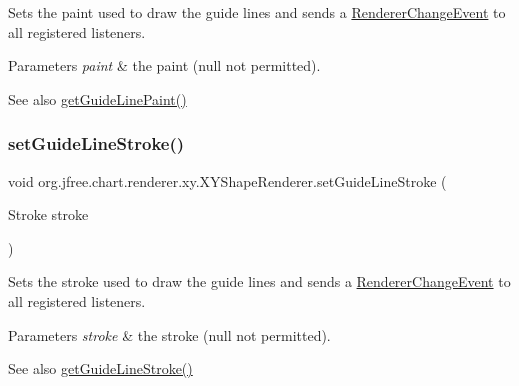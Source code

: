 Sets the paint used to draw the guide lines and sends a \mbox{\hyperlink{}{Renderer\+Change\+Event}} to all registered listeners.


\begin{DoxyParams}{Parameters}
{\em paint} & the paint ({\ttfamily null} not permitted).\\
\hline
\end{DoxyParams}
\begin{DoxySeeAlso}{See also}
\mbox{\hyperlink{classorg_1_1jfree_1_1chart_1_1renderer_1_1xy_1_1_x_y_shape_renderer_a8fea22363f2ab58a536657b999cb1a5f}{get\+Guide\+Line\+Paint()}} 
\end{DoxySeeAlso}
\mbox{\label{classorg_1_1jfree_1_1chart_1_1renderer_1_1xy_1_1_x_y_shape_renderer_a6a2c1eabb72522fc743402238dc29453}} 
\subsubsection{\texorpdfstring{set\+Guide\+Line\+Stroke()}{setGuideLineStroke()}}
{\footnotesize\ttfamily void org.\+jfree.\+chart.\+renderer.\+xy.\+X\+Y\+Shape\+Renderer.\+set\+Guide\+Line\+Stroke (\begin{DoxyParamCaption}\item[{Stroke}]{stroke }\end{DoxyParamCaption})}

Sets the stroke used to draw the guide lines and sends a \mbox{\hyperlink{}{Renderer\+Change\+Event}} to all registered listeners.


\begin{DoxyParams}{Parameters}
{\em stroke} & the stroke ({\ttfamily null} not permitted).\\
\hline
\end{DoxyParams}
\begin{DoxySeeAlso}{See also}
\mbox{\hyperlink{classorg_1_1jfree_1_1chart_1_1renderer_1_1xy_1_1_x_y_shape_renderer_af24b2b683eed8f240256c64cc5282c1b}{get\+Guide\+Line\+Stroke()}} 
\end{DoxySeeAlso}
\mbox{\label{classorg_1_1jfree_1_1chart_1_1renderer_1_1xy_1_1_x_y_shape_renderer_acc952376b7b01c311a047bbd6ecde93a}} 
